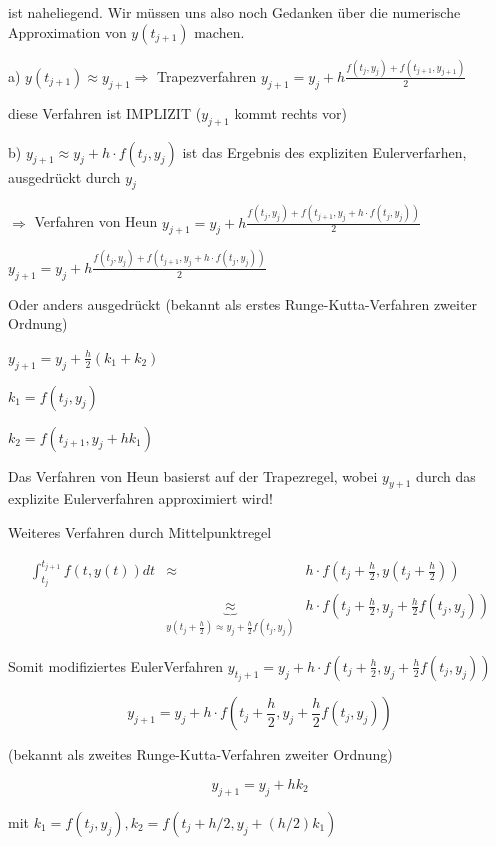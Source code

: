 \documentclass[10pt,a4paper]{article}
\begin{document}
ist naheliegend. Wir müssen uns also noch Gedanken über die numerische Approximation von $y(t_{j+1})$ machen.





a) $y(t_{j+1}) \approx y_{j+1} \Rightarrow$ Trapezverfahren $y_{j+1} = y_j + h \frac{f(t_j,y_j)+f(t_{j+1},y_{j+1})}{2}$

diese Verfahren ist IMPLIZIT ($y_{j+1}$ kommt rechts vor)


b) $y_{j+1} \approx y_j + h \cdot f(t_j,y_j)$ ist das Ergebnis des expliziten Eulerverfarhen, ausgedrückt durch $y_j$

$\Rightarrow$ Verfahren von Heun $y_{j+1} = y_j + h \frac{f(t_j,y_j)+f(t_{j+1},y_{j}+h \cdot f(t_j,y_j))}{2}$

\begin{defi}
$y_{j+1} = y_j + h \frac{f(t_j,y_j)+f(t_{j+1},y_{j}+h \cdot f(t_j,y_j))}{2}$

Oder anders ausgedrückt (bekannt als erstes Runge-Kutta-Verfahren zweiter Ordnung)


$y_{j+1}=y_j + \frac{h}{2} (k_1 + k_2)$

$k_1=f(t_j,y_j)$

$k_2=f(t_{j+1},y_j+hk_1)$

Das Verfahren von Heun basierst auf der Trapezregel, wobei $y_{y+1}$ durch das explizite Eulerverfahren approximiert wird!
\end{defi}



Weiteres Verfahren durch Mittelpunktregel

\begin{eqnarray*}
\int_{t_j}^{t_{j+1}} f(t,y(t)) dt & \approx & h \cdot f(t_j + \frac{h}{2},y(t_j+\frac{h}{2})) \\
 &\underbrace{\approx}_{y(t_j+\frac{h}{2}) \approx y_j + \frac{h}{2}f(t_j,y_j)}&  h\cdot f(t_j+\frac{h}{2},y_j+\frac{h}{2}f(t_j,y_j))
\end{eqnarray*}



Somit modifiziertes EulerVerfahren
$y_{t_j+1} = y_j+h\cdot f(t_j+\frac{h}{2},y_j+\frac{h}{2}f(t_j,y_j))$


\begin{defi}

$$y_{j+1}=y_j+h\cdot f(t_j+\frac{h}{2},y_j+\frac{h}{2} f(t_j,y_j))$$

(bekannt als zweites Runge-Kutta-Verfahren zweiter Ordnung)

$$y_{j+1}=y_j + h k_2$$ 

mit $k_1=f(t_j,y_j),k_2=f(t_j + h/2, y_j + (h/2)k_1)$

\end{defi}
\end{document}
